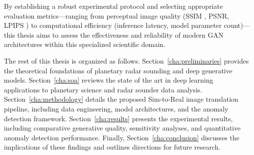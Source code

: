 By establishing a robust experimental protocol and selecting appropriate evaluation metrics---ranging from perceptual image quality (SSIM \cite{Wang_2004}, PSNR, LPIPS \cite{Zhang_2018_CVPR}) to computational efficiency (inference latency, model parameter count)---this thesis aims to assess the effectiveness and reliability of modern GAN architectures within this specialized scientific domain.

The rest of this thesis is organized as follows.
Section~\ref{cha:preliminaries} provides the theoretical foundations of planetary radar sounding and deep generative models.
Section~\ref{cha:soa} reviews the state of the art in deep learning applications to planetary science and radar sounder data analysis.
Section~\ref{cha:methodology} details the proposed Sim-to-Real image translation pipeline, including data engineering, model architectures, and the anomaly detection framework.
Section~\ref{cha:results} presents the experimental results, including comparative generative quality, sensitivity analyses, and quantitative anomaly detection performance.
Finally, Section~\ref{cha:conclusion} discusses the implications of these findings and outlines directions for future research.

